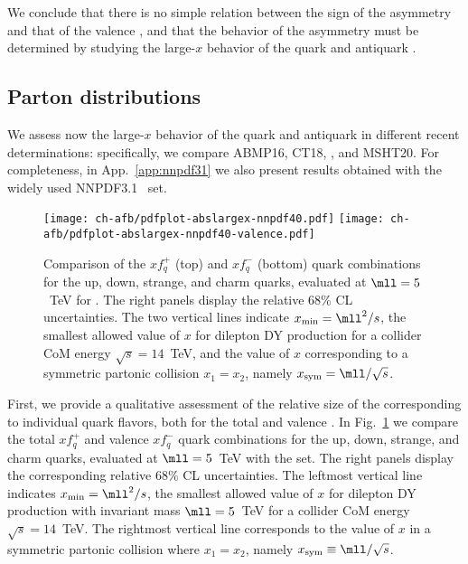 We conclude that there
is no simple relation between the sign of the asymmetry and that of
the valence \pdf, and that the
behavior of the asymmetry must be determined by studying the large-$x$
behavior of the quark and antiquark \pdfs.

\subsection{Parton distributions}
\label{sec:subsec-largexPDFs}

We assess now the large-$x$ behavior of
the quark and antiquark \pdfs in different recent \pdf
determinations: specifically, we compare
 ABMP16,
 CT18,  ,
 and MSHT20.
%
 For
completeness, in App.~\ref{app:nnpdf31} we also present results
obtained with the widely used NNPDF3.1~\cite{Ball:2017nwa} set.

\begin{figure}[!t]
 \centering
 \texttt{[image: ch-afb/pdfplot-abslargex-nnpdf40.pdf]}
 \texttt{[image: ch-afb/pdfplot-abslargex-nnpdf40-valence.pdf]}
 \caption{\small Comparison of the $xf^+_q$ (top) and $xf_q^-$ (bottom) quark
   \pdf combinations for the up, down, strange, and charm quarks,
   evaluated at $\mll=5$~TeV for  \nnlo.
   The right panels display the relative 68\% CL uncertainties.
   The two vertical lines indicate $x_{\rm min}=\mll^2/s$, the
   smallest allowed value of $x$ 
   for dilepton DY production for a collider
   CoM energy $\sqrt{s}=14$~TeV, and the value of $x$
   corresponding to a symmetric partonic collision $x_1=x_2$, namely
 $x_{\rm  sym}=\mll/\sqrt{s}$.
 }    
 \label{fig:pdfplot-abslargex}
\end{figure}

First, we provide a qualitative assessment of the relative size of the
\pdfs corresponding to
individual quark flavors, both for the total and valence \pdfs.
In Fig.~\ref{fig:pdfplot-abslargex} we
compare  the total $xf^+_q$ and valence $xf_q^-$  quark
   \pdf combinations for the up, down, strange, and charm quarks,
   evaluated at $\mll=5$~TeV with the  \nnlo \pdf set.
   The right panels display the corresponding relative 68\% CL uncertainties.
  The leftmost vertical line indicates $x_{\rm min}=\mll^2/s$, the
  smallest allowed value of $x$ 
   for dilepton DY production with invariant mass $\mll=5$~TeV for a collider
   CoM energy $\sqrt{s}=14$~TeV.
   The rightmost vertical line corresponds to
   the value of $x$ in a symmetric partonic collision where $x_1=x_2$, namely
   $x_{\rm  sym}\equiv\mll/\sqrt{s}$.

